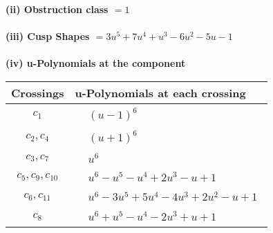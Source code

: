\documentclass[1p]{elsarticle_modified}
\theoremstyle{definition}
\begin{document}
\flushleft \textbf{(ii) Obstruction class $= 1$}\\~\\
\flushleft \textbf{(iii) Cusp Shapes $= 3 u^5+7 u^4+u^3-6 u^2-5 u-1$}\\~\\
\newpage\renewcommand{\arraystretch}{1}
\flushleft \textbf{(iv) u-Polynomials at the component}\newline \\
\begin{tabular}{m{50pt}|m{274pt}}
Crossings & \hspace{64pt}u-Polynomials at each crossing \\
\hline $$\begin{aligned}c_{1}\end{aligned}$$&$\begin{aligned}
&(u-1)^6
\end{aligned}$\\
\hline $$\begin{aligned}c_{2},c_{4}\end{aligned}$$&$\begin{aligned}
&(u+1)^6
\end{aligned}$\\
\hline $$\begin{aligned}c_{3},c_{7}\end{aligned}$$&$\begin{aligned}
&u^6
\end{aligned}$\\
\hline $$\begin{aligned}c_{5},c_{9},c_{10}\end{aligned}$$&$\begin{aligned}
&u^6- u^5- u^4+2 u^3- u+1
\end{aligned}$\\
\hline $$\begin{aligned}c_{6},c_{11}\end{aligned}$$&$\begin{aligned}
&u^6-3 u^5+5 u^4-4 u^3+2 u^2- u+1
\end{aligned}$\\
\hline $$\begin{aligned}c_{8}\end{aligned}$$&$\begin{aligned}
&u^6+u^5- u^4-2 u^3+u+1
\end{aligned}$\\
\hline
\end{tabular}\\~\\
\end{document}
